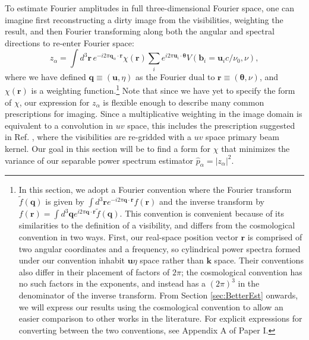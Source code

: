 \documentclass[twocolumn,aps,prd,nofootinbib,showpacs]{revtex4-1}
\begin{document}
To estimate Fourier amplitudes in full three-dimensional Fourier space, one can imagine first reconstructing a dirty image from the visibilities, weighting the result, and then Fourier transforming along both the angular and spectral directions to re-enter Fourier space:
\begin{equation}
\label{eq:zalpha}
z_\alpha = \int d^3\mathbf{r}\, e^{-i 2\pi \mathbf{q}_\alpha \cdot \mathbf{r}} \chi (\mathbf{r}) \sum_i e^{i 2 \pi \mathbf{u}_i \cdot \boldsymbol \theta} V(\mathbf{b}_i = \mathbf{u}_i c / \nu_0, \nu),
\end{equation}
where we have defined $\mathbf{q} \equiv (\mathbf{u}, \eta)$ as the Fourier dual to $\mathbf{r} \equiv (\boldsymbol \theta, \nu)$, and $\chi(\mathbf{r})$ is a weighting function.\footnote{In this section, we adopt a Fourier convention where the Fourier transform $\widetilde{f} (\mathbf{q})$ is given by $\int d^3 \mathbf{r} e^{-i 2\pi \mathbf{q} \cdot \mathbf{r}} f(\mathbf{r})$ and the inverse transform by $f(\mathbf{r}) = \int d^3 \mathbf{q} e^{i 2\pi \mathbf{q} \cdot \mathbf{r}} \widetilde{f} (\mathbf{q})$.  This convention is convenient because of its similarities to the definition of a visibility, and differs from the cosmological convention in two ways.  First, our real-space position vector $\mathbf{r}$ is comprised of two angular coordinates and a frequency, so cylindrical power spectra formed under our convention inhabit $\mathbf{u}\eta$ space rather than $\mathbf{k}$ space.  Their conventions also differ in their placement of factors of $2\pi$; the cosmological convention has no such factors in the exponents, and instead has a $(2\pi)^3$ in the denominator of the inverse transform.  From Section \ref{sec:BetterEst} onwards, we will express our results using the cosmological convention to allow an easier comparison to other works in the literature.  For explicit expressions for converting between the two conventions, see Appendix A of Paper I.}  Note that since we have yet to specify the form of $\chi$, our expression for $z_\alpha$ is flexible enough to describe many common prescriptions for imaging.  Since a multiplicative weighting in the image domain is equivalent to a convolution in $uv$ space, this includes  the prescription suggested in Ref. \cite{Tegmark1997a,Morales2008}, where the visibilities are re-gridded with a $uv$ space primary beam kernel.  Our goal in this section will be to find a form for $\chi$ that minimizes the variance of our separable power spectrum estimator $\widehat{p}_\alpha =  | z_\alpha |^2$.
\end{document}

